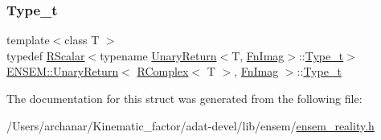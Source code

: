 \mbox{\label{structENSEM_1_1UnaryReturn_3_01RComplex_3_01T_01_4_00_01FnImag_01_4_a5e8cda9513c7e5cb0b7182122bd82513}} 
\subsubsection{\texorpdfstring{Type\_t}{Type\_t}\hspace{0.1cm}{\footnotesize\ttfamily [3/3]}}
{\footnotesize\ttfamily template$<$class T $>$ \\
typedef \mbox{\hyperlink{classENSEM_1_1RScalar}{R\+Scalar}}$<$typename \mbox{\hyperlink{structENSEM_1_1UnaryReturn}{Unary\+Return}}$<$T, \mbox{\hyperlink{structENSEM_1_1FnImag}{Fn\+Imag}}$>$\+::\mbox{\hyperlink{structENSEM_1_1UnaryReturn_3_01RComplex_3_01T_01_4_00_01FnImag_01_4_a5e8cda9513c7e5cb0b7182122bd82513}{Type\+\_\+t}}$>$ \mbox{\hyperlink{structENSEM_1_1UnaryReturn}{E\+N\+S\+E\+M\+::\+Unary\+Return}}$<$ \mbox{\hyperlink{classENSEM_1_1RComplex}{R\+Complex}}$<$ T $>$, \mbox{\hyperlink{structENSEM_1_1FnImag}{Fn\+Imag}} $>$\+::\mbox{\hyperlink{structENSEM_1_1UnaryReturn_3_01RComplex_3_01T_01_4_00_01FnImag_01_4_a5e8cda9513c7e5cb0b7182122bd82513}{Type\+\_\+t}}}



The documentation for this struct was generated from the following file\+:\begin{DoxyCompactItemize}
\item 
/\+Users/archanar/\+Kinematic\+\_\+factor/adat-\/devel/lib/ensem/\mbox{\hyperlink{adat-devel_2lib_2ensem_2ensem__reality_8h}{ensem\+\_\+reality.\+h}}\end{DoxyCompactItemize}
